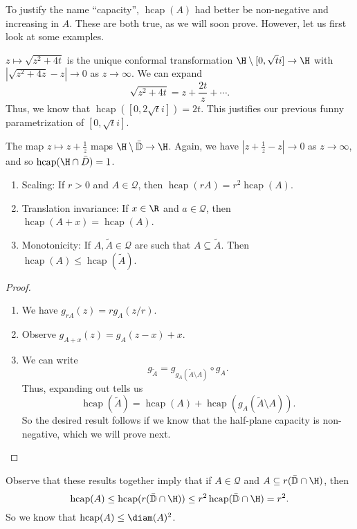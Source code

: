 \documentclass[a4paper]{article}
\renewcommand\D{\mathbb{D}}
\DeclareMathOperator\hcap{hcap}
\begin{document}
To justify the name ``capacity'', $\hcap(A)$ had better be non-negative and increasing in $A$. These are both true, as we will soon prove. However, let us first look at some examples.

\begin{eg}
  $z \mapsto \sqrt{z^2 + 4t}$ is the unique conformal transformation $\H \setminus [0, \sqrt{t}i] \to \H$ with $|\sqrt{z^2 + 4z} - z| \to 0$ as $z \to \infty$. We can expand
  \[
    \sqrt{z^2 + 4t} = z + \frac{2t}{z} + \cdots.
  \]
  Thus, we know that $\hcap([0, 2\sqrt{t} i]) = 2t$. This justifies our previous funny parametrization of $[0, \sqrt{t} i]$.
\end{eg}

\begin{eg}
  The map $z \mapsto z + \frac{1}{z}$ maps $\H \setminus \bar{\D} \to \H$. Again, we have $\left|z + \frac{1}{z} - z\right| \to 0$ as $z \to \infty$, and so $\hcap(\H \cap \bar{D}) = 1$.
\end{eg}

\begin{prop}\leavevmode
  \begin{enumerate}
    \item Scaling: If $r > 0$ and $A \in \mathcal{Q}$, then $\hcap(rA) = r^2 \hcap(A)$.
    \item Translation invariance: If $x \in \R$ and $a \in \mathcal{Q}$, then $\hcap(A + x) = \hcap(A)$.
    \item Monotonicity: If $A, \tilde{A} \in \mathcal{Q}$ are such that $A \subseteq \tilde{A}$. Then $\hcap(A) \leq \hcap(\tilde{A})$.
  \end{enumerate}
\end{prop}

\begin{proof}\leavevmode
  \begin{enumerate}
    \item We have $g_{rA}(z) = r g_A(z/r)$.
    \item Observe $g_{A + x}(z) = g_A(z - x) + x$.
    \item We can write
      \[
        g_{\tilde{A}} = g_{g_A(\tilde{A} \setminus A)} \circ g_A.
      \]
      Thus, expanding out tells us
      \[
        \hcap(\tilde{A}) = \hcap(A) + \hcap(g_A(\tilde{A}\setminus A)).
      \]
      So the desired result follows if we know that the half-plane capacity is non-negative, which we will prove next.\qedhere
  \end{enumerate}
\end{proof}
Observe that these results together imply that if $A \in \mathcal{Q}$ and $A \subseteq r(\bar{\D} \cap \H)$, then
\[
  \hcap(A) \leq \hcap(r(\bar{\D} \cap \H)) \leq r^2 \hcap (\bar{\D} \cap \H) = r^2.
\]
So we know that $\hcap(A) \leq \diam(A)^2$.
\end{document}
